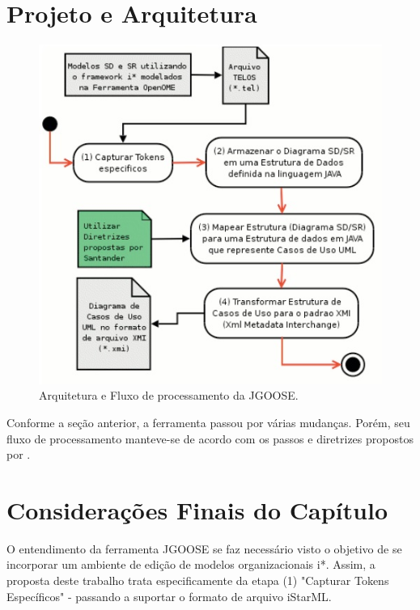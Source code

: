     \section{Projeto e Arquitetura}
        \begin{figure}[htb]
            \centering
                \includegraphics[width=0.7\linewidth]{Figuras/jgoose-arquitetura.jpg}
                \caption{Arquitetura e Fluxo de processamento da JGOOSE.}
                \label{fig:jgoose-arquitetura}
        \end{figure}
        Conforme a seção anterior, a ferramenta passou por várias mudanças. Porém, seu fluxo de processamento manteve-se de acordo com os passos e diretrizes propostos por \cite{santander2002integrando}.
        

    \section{Considerações Finais do Capítulo}
        O entendimento da ferramenta JGOOSE se faz necessário visto o objetivo de se incorporar um ambiente de edição de modelos organizacionais i*.
        Assim, a proposta deste trabalho trata especificamente da etapa (1) "Capturar Tokens Específicos" - passando a suportar o formato de arquivo iStarML.


% 
